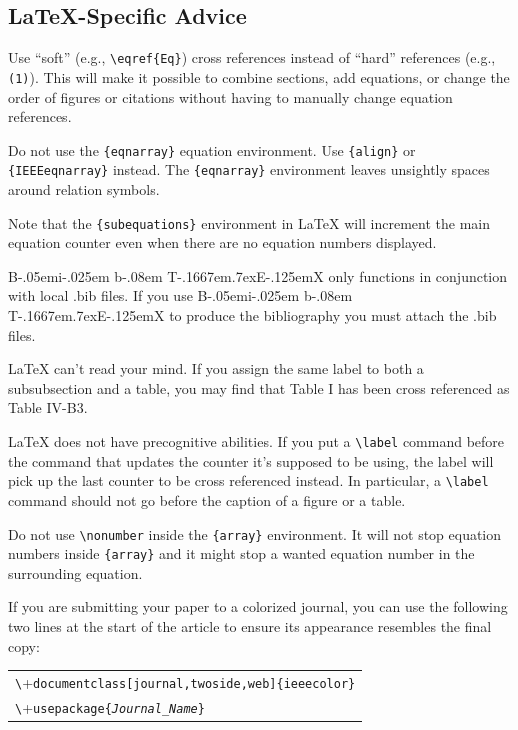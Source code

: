\documentclass[journal,twoside,web]{ieeecolor}
\def\BibTeX{{\rm B\kern-.05em{\sc i\kern-.025em b}\kern-.08em
    T\kern-.1667em\lower.7ex\hbox{E}\kern-.125emX}}
\begin{document}
\subsection{\LaTeX-Specific Advice}

Use ``soft'' (e.g., \verb|\eqref{Eq}|) cross references instead
of ``hard'' references (e.g., \verb|(1)|). This will make it possible
to combine sections, add equations, or change the order of figures or
citations without having to manually change equation references.

Do not use the \verb|{eqnarray}| equation environment. Use
\verb|{align}| or \verb|{IEEEeqnarray}| instead. The \verb|{eqnarray}|
environment leaves unsightly spaces around relation symbols.

Note that the \verb|{subequations}| environment in {\LaTeX}
will increment the main equation counter even when there are no
equation numbers displayed.

{\BibTeX} only functions in conjunction with local .bib files. If you use {\BibTeX} to produce the
bibliography you must attach the .bib files.

{\LaTeX} can't read your mind. If you assign the same label to both a
subsubsection and a table, you may find that Table I has been cross
referenced as Table IV-B3. 

{\LaTeX} does not have precognitive abilities. If you put a
\verb|\label| command before the command that updates the counter it's
supposed to be using, the label will pick up the last counter to be
cross referenced instead. In particular, a \verb|\label| command
should not go before the caption of a figure or a table.

Do not use \verb|\nonumber| inside the \verb|{array}| environment. It
will not stop equation numbers inside \verb|{array}| and it might stop a
wanted equation number in the surrounding equation.

If you are submitting your paper to a colorized journal, you can use
the following two lines at the start of the article to ensure its
appearance resembles the final copy:

\smallskip\noindent
\begin{small}
\begin{tabular}{l}
\verb+\+\texttt{documentclass[journal,twoside,web]\{ieeecolor\}}\\
\verb+\+\texttt{usepackage\{\textit{Journal\_Name}\}}
\end{tabular}
\end{small}
\end{document}
